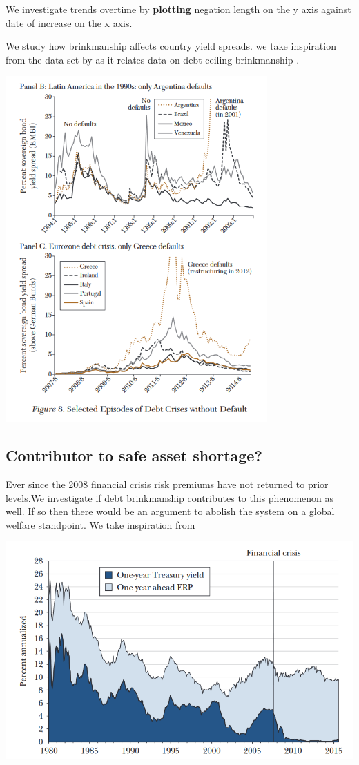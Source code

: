 \documentclass[
  12pt]{article}
\begin{document}
We investigate trends overtime by \textbf{plotting} negation length on
the y axis against date of increase on the x axis.

We study how brinkmanship affects country yield spreads. we take
inspiration from the data set by \citep{meyer2022} as it relates data on
debt ceiling brinkmanship \citep{reinhart2008}.

\includegraphics[width=3.94792in,height=\textheight]{style-guide/overtime_brink_2.png}

\hypertarget{contributor-to-safe-asset-shortage}{%
\subsection{Contributor to safe asset
shortage?}\label{contributor-to-safe-asset-shortage}}

Ever since the 2008 financial crisis risk premiums have not returned to
prior levels\citep{caballero2017}.We investigate if debt brinkmanship
contributes to this phenomenon as well. If so then there would be an
argument to abolish the system on a global welfare standpoint. We take
inspiration from

\includegraphics[width=6.10417in,height=\textheight]{style-guide/1_year_ERP.png}
\end{document}
